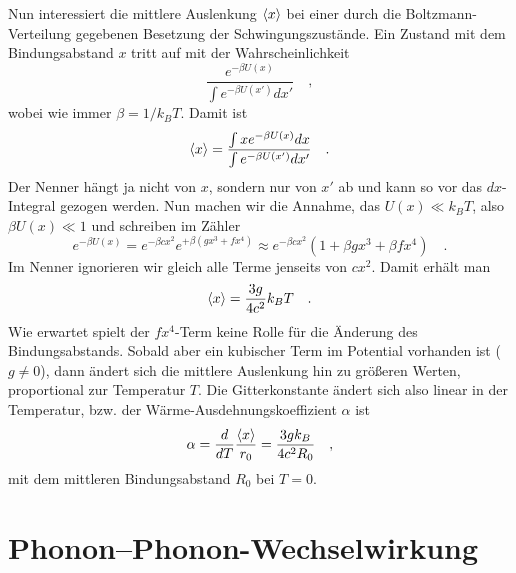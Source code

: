 Nun interessiert die mittlere Auslenkung $\braket{x}$ bei einer durch die Boltzmann-Verteilung gegebenen Besetzung der Schwingungszustände. Ein Zustand mit dem Bindungsabstand $x$ tritt auf mit der Wahrscheinlichkeit
\begin{equation}
    \frac{e^{- \beta U(x)}}{\int  e^{- \beta U(x')} dx'} \quad ,
\end{equation}
wobei wie immer $\beta = 1 / k_B T$.
Damit ist 
\begin{equation}
  \braket{x} =   \frac{\int x e^{- \beta U(x)} dx}{\int e^{- \beta U(x')} dx'} \quad .
\end{equation}
Der Nenner hängt ja nicht von $x$, sondern nur von $x'$ ab und kann so vor das $dx$-Integral gezogen werden. Nun machen wir die Annahme, das $U(x) \ll k_B T$, also $\beta U(x) \ll 1$ und schreiben im Zähler
\begin{equation}
    e^{- \beta U(x)} = e^{- \beta c x^2} e^{+ \beta (g x^3 + f x^4)} \approx e^{- \beta c x^2}  \left( 1+ \beta g x^3 + \beta f x^4 \right)
    \quad .
\end{equation}
Im Nenner ignorieren wir gleich alle Terme jenseits von $c x^2$. Damit erhält man 
\begin{equation}
    \braket{x} = \frac{3 g}{4 c^2} k_B T \quad .
\end{equation}
Wie erwartet spielt der $f x^4$-Term keine Rolle für die Änderung des Bindungsabstands.
Sobald aber ein kubischer Term im Potential vorhanden ist ($g \neq 0$), dann ändert sich die mittlere Auslenkung hin zu größeren Werten, proportional zur Temperatur $T$. Die Gitterkonstante ändert sich also linear in der Temperatur, bzw. der Wärme-Ausdehnungskoeffizient $\alpha$ ist 
\begin{equation}
    \alpha = \frac{d}{dT} \frac{ \braket{x}}{r_0} = \frac{3 g k_B}{4 c^2 R_0}  \quad ,
\end{equation}
mit dem mittleren Bindungsabstand $R_0$ bei $T=0$.






\section*{Phonon--Phonon-Wechselwirkung}

